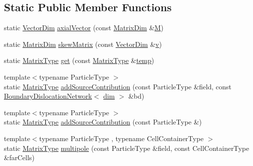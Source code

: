 \subsection*{Static Public Member Functions}
\begin{DoxyCompactItemize}
\item 
static \hyperlink{structmodel_1_1_dislocation_stress_ac1462cad65fdf33aa42341301aee8c48}{Vector\+Dim} \hyperlink{structmodel_1_1_dislocation_stress_a6b559e6cfa4beb1d9b4c4215b8299fba}{axial\+Vector} (const \hyperlink{structmodel_1_1_dislocation_stress_a2cf61e24522b244ae3024b58195d8e6e}{Matrix\+Dim} \&\hyperlink{_cubic_spline_intersection_8m_a48f6c6b9e0143634f0f43dc5729cb0c1}{M})
\item 
static \hyperlink{structmodel_1_1_dislocation_stress_a2cf61e24522b244ae3024b58195d8e6e}{Matrix\+Dim} \hyperlink{structmodel_1_1_dislocation_stress_ac137e9603f9cd6d87ed16f18facdf6e2}{skew\+Matrix} (const \hyperlink{structmodel_1_1_dislocation_stress_ac1462cad65fdf33aa42341301aee8c48}{Vector\+Dim} \&\hyperlink{_cubic_spline_intersection_8m_a0a73e3284aebbe8bc1ba30f3efb9561a}{v})
\item 
static \hyperlink{structmodel_1_1_dislocation_stress_a58cfb5429639657d58da42d9c3854505}{Matrix\+Type} \hyperlink{structmodel_1_1_dislocation_stress_a91ec33eb6287f14d16465a5f348dd73c}{get} (const \hyperlink{structmodel_1_1_dislocation_stress_a58cfb5429639657d58da42d9c3854505}{Matrix\+Type} \&\hyperlink{tube_plotter_8m_a905c521e05ec8042631a912b71d0454e}{temp})
\item 
{\footnotesize template$<$typename Particle\+Type $>$ }\\static \hyperlink{structmodel_1_1_dislocation_stress_a58cfb5429639657d58da42d9c3854505}{Matrix\+Type} \hyperlink{structmodel_1_1_dislocation_stress_a0c98dd0d842387db2f3480fd3340ece8}{add\+Source\+Contribution} (const Particle\+Type \&field, const \hyperlink{classmodel_1_1_boundary_dislocation_network}{Boundary\+Dislocation\+Network}$<$ \hyperlink{structmodel_1_1_dislocation_stress_acd45411c1dd348187e8a3ecdda35d793}{dim} $>$ \&bd)
\item 
{\footnotesize template$<$typename Particle\+Type $>$ }\\static \hyperlink{structmodel_1_1_dislocation_stress_a58cfb5429639657d58da42d9c3854505}{Matrix\+Type} \hyperlink{structmodel_1_1_dislocation_stress_ac0ea7c8e590c42539ed79c2c7b5fe34e}{add\+Source\+Contribution} (const Particle\+Type \&)
\item 
{\footnotesize template$<$typename Particle\+Type , typename Cell\+Container\+Type $>$ }\\static \hyperlink{structmodel_1_1_dislocation_stress_a58cfb5429639657d58da42d9c3854505}{Matrix\+Type} \hyperlink{structmodel_1_1_dislocation_stress_ae3628ec46e3bad333419cb02862fc86e}{multipole} (const Particle\+Type \&field, const Cell\+Container\+Type \&far\+Cells)

\end{DoxyCompactItemize}
